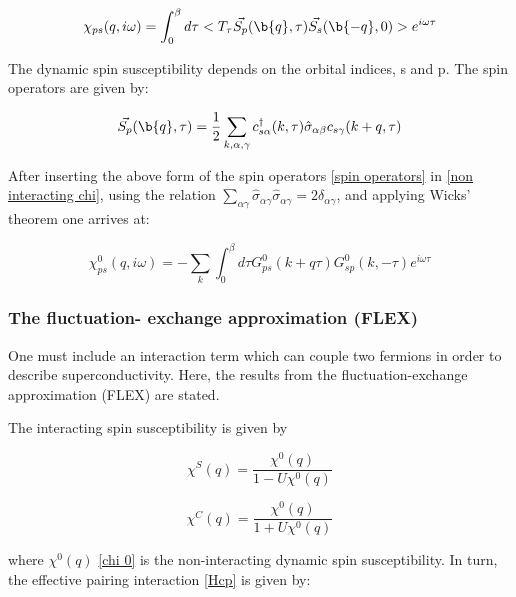 \documentclass[12pt]{article}
\begin{document}
\begin{equation} \label{non interacting chi}
    \chi_{ps}(q,i\omega) = \int_{0}^{\beta} d\tau <T_{\tau} \vec{S_p}(\b{q}, \tau) \vec{S_s}(\b{-q}, 0)>e^{i\omega \tau} 
\end{equation}

The dynamic spin susceptibility depends on the orbital indices, s and p. The spin operators are given by:

\begin{equation} \label{spin operators}
    \vec{S_p}(\b{q}, \tau) = \frac{1}{2} \sum_{k, \alpha, \gamma} c^{\dagger}_{s \alpha}(k, \tau) \hat{\sigma}_{\alpha \beta} c_{s \gamma}(k + q, \tau)
\end{equation}



After inserting the above form of the spin operators \eqref{spin operators} in \eqref{non interacting chi}, using the relation $\sum_{\alpha \gamma} \hat{\sigma}_{\alpha \gamma} \hat{\sigma}_{\alpha \gamma} = 2 \delta_{\alpha\gamma}$, and applying Wicks' theorem one arrives at:

\begin{equation}\label{chi 0}
    \chi_{ps}^0(q, i \omega) = -\sum_{k} \int_{0}^{\beta} d\tau G^0_{ps}(k+q \tau) G^0_{sp}(k, -\tau)e^{i\omega \tau}
\end{equation}

\subsubsection{ The fluctuation- exchange approximation (FLEX)}

One must include an interaction term which can couple two fermions in order to describe superconductivity. Here, the results from the fluctuation-exchange approximation (FLEX) are stated.

The interacting spin susceptibility is given by 

\begin{equation}
    \chi^S(q) = \frac{\chi^0(q)}{1 - U \chi^0 (q)}
\end{equation}

\begin{equation}
    \chi^C(q) = \frac{\chi^0(q)}{1 + U \chi^0 (q)}
\end{equation}

where $\chi^0(q)$ \eqref{chi 0} is the non-interacting dynamic spin susceptibility. In turn, the effective pairing interaction \eqref{Hcp} is given by:
\end{document}
